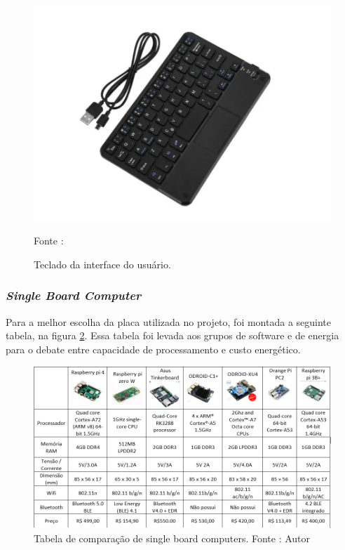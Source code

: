 \begin{figure}[H]
  \centering
  \includegraphics[scale=0.5]{figuras/TecladoPI2.png}
  \caption{Teclado da interface do usuário.}
  {\footnotesize Fonte : \cite{figura_Teclado}} 
  \label{fig:Teclado}
\end{figure}

\subsubsection{ \textit{Single Board Computer}}

Para a melhor escolha da placa utilizada no projeto, foi montada a seguinte tabela, na figura \ref{fig:comparacaoMicro}. Essa tabela foi levada aos grupos de software e de energia para o debate entre capacidade de processamento e custo energético.

\begin{figure}[H]
  \centering
  \includegraphics[scale=0.8]{figuras/SBCcomparacao.png}
  \caption{Tabela de comparação de single board computers. Fonte : Autor } 
  \label{fig:comparacaoMicro}
\end{figure}

